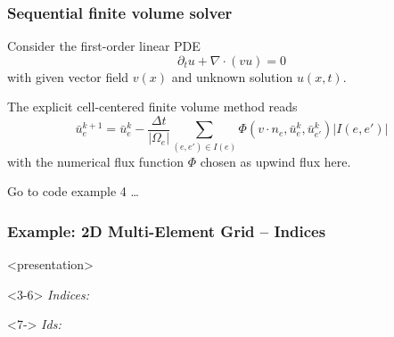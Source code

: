 \documentclass[aspectratio=169,11pt]{beamer}
\theoremstyle{definition}
\begin{document}
\begin{frame}[fragile]
  \frametitle{Sequential finite volume solver}
Consider the first-order linear PDE
$$ \partial_t u + \nabla\cdot(vu) = 0$$
with given vector field $v(x)$ and unknown solution $u(x,t)$.

The explicit cell-centered finite volume method reads
$$ \bar{u}_e^{k+1} = \bar{u}_e^{k} - \frac{\Delta t}{|\Omega_e|} \sum_{(e,e')\in I(e)}
\Phi(v\cdot n_e,\bar{u}_e^{k},\bar{u}_{e'}^{k}) |I(e,e')|$$
with the numerical flux function $\Phi$ chosen as upwind flux here.

\begin{center}
Go to code example 4 \ldots
\end{center}
\end{frame}

\begin{frame}
  \frametitle{Example: 2D Multi-Element Grid -- Indices}

  \begin{onlyenv}<presentation>
    \vspace*{2ex}
    \begin{overlayarea}{\linewidth}{3ex}
      \medskip
      \begin{onlyenv}<3-6> \emph{Indices:}
      \end{onlyenv}
      \begin{onlyenv}<7-> \emph{Ids:}
      \end{onlyenv}
    \end{overlayarea}
  \end{onlyenv}

  \begin{overlayarea}{\linewidth}{0.45\linewidth}
    \begin{center}


\end{center}
\end{overlayarea}
\end{frame}
\end{document}
